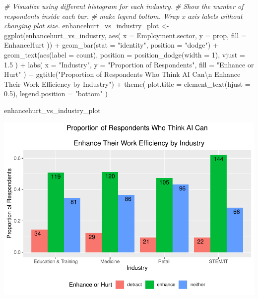 \documentclass[
]{article}
\newenvironment{Shaded}{\begin{snugshade}}{\end{snugshade}}
\newcommand{\AttributeTok}[1]{\textcolor[rgb]{0.77,0.63,0.00}{#1}}
\newcommand{\CommentTok}[1]{\textcolor[rgb]{0.56,0.35,0.01}{\textit{#1}}}
\newcommand{\DecValTok}[1]{\textcolor[rgb]{0.00,0.00,0.81}{#1}}
\newcommand{\FloatTok}[1]{\textcolor[rgb]{0.00,0.00,0.81}{#1}}
\newcommand{\FunctionTok}[1]{\textcolor[rgb]{0.00,0.00,0.00}{#1}}
\newcommand{\NormalTok}[1]{#1}
\newcommand{\OtherTok}[1]{\textcolor[rgb]{0.56,0.35,0.01}{#1}}
\newcommand{\SpecialCharTok}[1]{\textcolor[rgb]{0.00,0.00,0.00}{#1}}
\newcommand{\StringTok}[1]{\textcolor[rgb]{0.31,0.60,0.02}{#1}}
\begin{document}
\begin{Shaded}
\begin{Highlighting}[]
\CommentTok{\# Visualize using different histogram for each industry.}
\CommentTok{\# Show the number of respondents inside each bar.}
\CommentTok{\# make legend bottom. Wrap x axis labels without changing plot size.}
\NormalTok{enhancehurt\_vs\_industry\_plot }\OtherTok{\textless{}{-}} \FunctionTok{ggplot}\NormalTok{(enhancehurt\_vs\_industry, }\FunctionTok{aes}\NormalTok{(}
  \AttributeTok{x =}\NormalTok{ Employment.sector,}
  \AttributeTok{y =}\NormalTok{ prop, }\AttributeTok{fill =}\NormalTok{ EnhanceHurt}
\NormalTok{)) }\SpecialCharTok{+}
  \FunctionTok{geom\_bar}\NormalTok{(}\AttributeTok{stat =} \StringTok{"identity"}\NormalTok{, }\AttributeTok{position =} \StringTok{"dodge"}\NormalTok{) }\SpecialCharTok{+}
  \FunctionTok{geom\_text}\NormalTok{(}\FunctionTok{aes}\NormalTok{(}\AttributeTok{label =}\NormalTok{ count),}
    \AttributeTok{position =} \FunctionTok{position\_dodge}\NormalTok{(}\AttributeTok{width =} \DecValTok{1}\NormalTok{),}
    \AttributeTok{vjust =} \FloatTok{1.5}
\NormalTok{  ) }\SpecialCharTok{+}
  \FunctionTok{labs}\NormalTok{(}
    \AttributeTok{x =} \StringTok{"Industry"}\NormalTok{, }\AttributeTok{y =} \StringTok{"Proportion of Respondents"}\NormalTok{,}
    \AttributeTok{fill =} \StringTok{"Enhance or Hurt"}
\NormalTok{  ) }\SpecialCharTok{+}
  \FunctionTok{ggtitle}\NormalTok{(}\StringTok{"Proportion of Respondents Who Think AI Can}\SpecialCharTok{\textbackslash{}n}
\StringTok{  Enhance Their Work Efficiency by Industry"}\NormalTok{) }\SpecialCharTok{+}
  \FunctionTok{theme}\NormalTok{(}
    \AttributeTok{plot.title =} \FunctionTok{element\_text}\NormalTok{(}\AttributeTok{hjust =} \FloatTok{0.5}\NormalTok{),}
    \AttributeTok{legend.position =} \StringTok{"bottom"}
\NormalTok{  )}

\NormalTok{enhancehurt\_vs\_industry\_plot}
\end{Highlighting}
\end{Shaded}

\includegraphics{analysis_files/figure-latex/enhancehurt-vs-industry-1.pdf}
\end{document}
